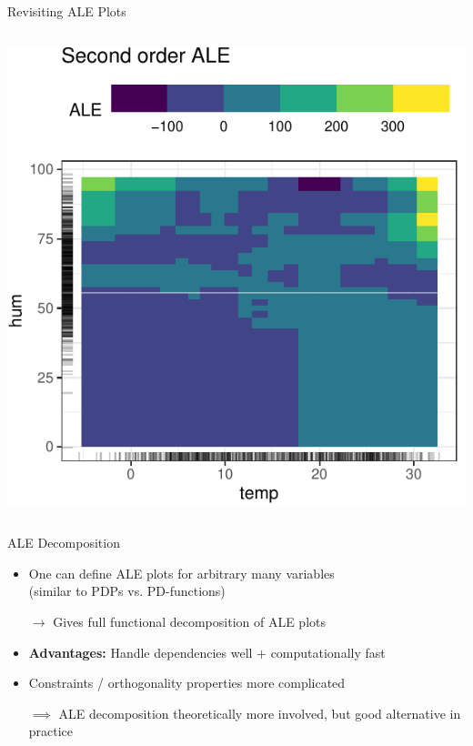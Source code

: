 \documentclass[11pt,compress,t,notes=noshow, aspectratio=169, xcolor=table]{beamer}
\begin{document}
\begin{frame}{Revisiting ALE Plots}
\begin{columns}[c, totalwidth=\linewidth]
\begin{column}{0.5\textwidth}
        \includegraphics{figure/ale2d}
    \end{column}
    \end{columns}

    
\end{frame}

\begin{frame}{ALE Decomposition}

    \begin{itemize}
        \item One can define ALE plots for arbitrary many variables \\
        (similar to PDPs vs. PD-functions)
        \item[$\rightarrow$] Gives full functional decomposition of ALE plots
        \pause
        \item \textbf{Advantages:} Handle dependencies well + computationally fast
        \item Constraints / orthogonality properties more complicated
        \item[$\implies$] ALE decomposition theoretically more involved, but good alternative in practice
    \end{itemize}
    
\end{frame}
\end{document}
